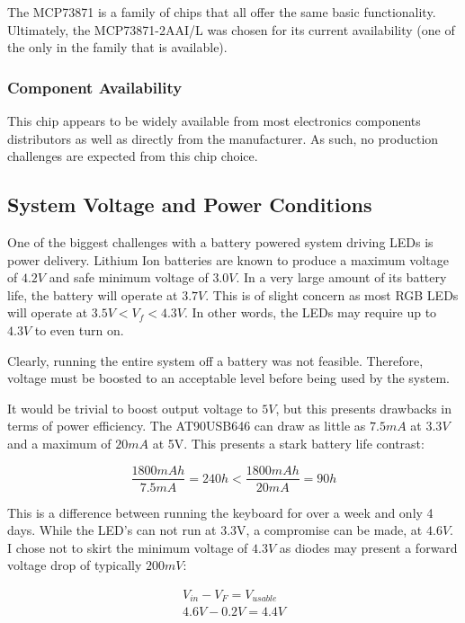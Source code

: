 \documentclass[11pt]{article}
\begin{document}
The MCP73871 is a family of chips that all offer the same basic functionality. Ultimately, the MCP73871-2AAI/L was chosen for its current availability (one of the only in the family that is available).

\subsubsection{Component Availability}

This chip appears to be widely available from most electronics components distributors as well as directly from the manufacturer. As such, no production challenges are expected from this chip choice.

\subsection{System Voltage and Power Conditions}

One of the biggest challenges with a battery powered system driving LEDs is power delivery. Lithium Ion batteries are known to produce a maximum voltage of \(4.2V\) and safe minimum voltage of \(3.0V\). In a very large amount of its battery life, the battery will operate at \(3.7V\). This is of slight concern as most RGB LEDs will operate at \(3.5V < V_f < 4.3V\). In other words, the LEDs may require up to \(4.3V\) to even turn on.

Clearly, running the entire system off a battery was not feasible. Therefore, voltage must be boosted to an acceptable level before being used by the system. 

It would be trivial to boost output voltage to \(5V\), but this presents drawbacks in terms of power efficiency. The AT90USB646 can draw as little as \(7.5mA\) at \(3.3V\) and a maximum of \(20mA\) at 5V. This presents a stark battery life contrast:

$$ \frac{1800mAh}{7.5mA} = 240h < \frac{1800mAh}{20mA} = 90h $$

This is a difference between running the keyboard for over a week and only 4 days. While the LED's can not run at 3.3V, a compromise can be made, at \(4.6V\). I chose not to skirt the minimum voltage of \(4.3V\) as diodes may present a forward voltage drop of typically \(200mV\): 

\begin{equation}
\begin{aligned}
V_{in} - V_{F} = V_{usable} \\
4.6V - 0.2V = 4.4V
\end{aligned}
\end{equation}
\end{document}
